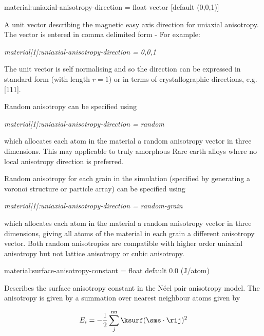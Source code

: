 {\zicf material:uniaxial-anisotropy-direction = float vector [default (0,0,1)]} A unit vector \ei describing the magnetic easy axis direction for uniaxial anisotropy. The vector is entered in comma delimited form - For example:

\textit{material[1]:uniaxial-anisotropy-direction = 0,0,1}

\noindent The unit vector is self normalising and so the direction can be expressed in standard form (with length $r =  1$) or in terms of crystallographic directions, e.g. [111].

\noindent Random anisotropy can be specified using

\textit{material[1]:uniaxial-anisotropy-direction = random}

\noindent which allocates each atom in the material a random anisotropy vector in three dimensions. This may applicable to truly amorphous Rare earth alloys where no local anisotropy direction is preferred.

Random anisotropy for each grain in the simulation (specified by generating a voronoi structure or particle array) can be specified using

\textit{material[1]:uniaxial-anisotropy-direction = random-grain}

which allocates each atom in the material a random anisotropy vector in three dimensions, giving all atoms of the material in each grain a different
anisotropy vector. Both random anisotropies are compatible with higher order uniaxial anisotropy but not lattice anisotropy or cubic anisotropy.



{\zicf material:surface-anisotropy-constant = float default 0.0 (J/atom)} Describes the surface anisotropy constant in the N\'eel pair anisotropy model. The anisotropy is given by a summation over nearest neighbour atoms given by

\begin{equation*}
E_i = -\frac{1}{2} \sum_j^{\mathrm{nn}} \ksurf (\sms \cdot \rij )^2
\end{equation*}


